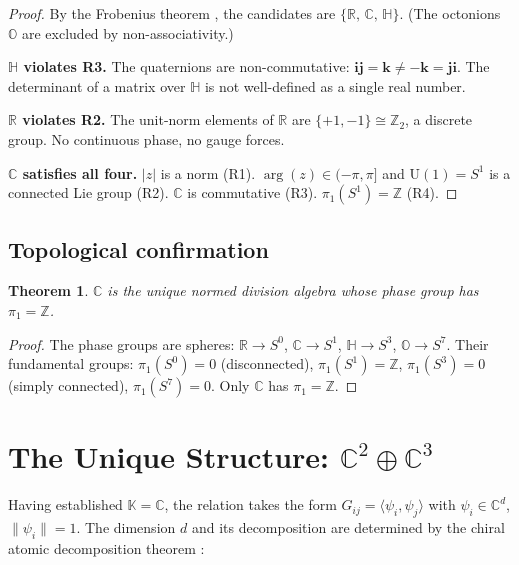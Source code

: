 \documentclass[12pt]{amsart}
\newtheorem{theorem}{Theorem}[section]
\theoremstyle{definition}
\theoremstyle{remark}
\newcommand{\CC}{\mathbb{C}}
\newcommand{\RR}{\mathbb{R}}
\newcommand{\HH}{\mathbb{H}}
\newcommand{\ZZ}{\mathbb{Z}}
\begin{document}
\begin{proof}
By the Frobenius theorem \cite{Frobenius},
the candidates are
$\{\RR,\, \CC,\, \HH\}$.
(The octonions $\mathbb{O}$ are excluded by
non-associativity.)

\medskip\noindent
\textbf{$\HH$ violates R3.}
The quaternions are non-commutative:
$\mathbf{i}\mathbf{j} = \mathbf{k}
\ne -\mathbf{k} = \mathbf{j}\mathbf{i}$.
The determinant of a matrix over $\HH$
is not well-defined as a single real number.

\medskip\noindent
\textbf{$\RR$ violates R2.}
The unit-norm elements of $\RR$ are
$\{+1, -1\} \cong \ZZ_2$,
a discrete group.
No continuous phase, no gauge forces.

\medskip\noindent
\textbf{$\CC$ satisfies all four.}
$|z|$ is a norm (R1).
$\arg(z) \in (-\pi, \pi]$
and $\mathrm{U}(1) = S^1$ is a
connected Lie group (R2).
$\CC$ is commutative (R3).
$\pi_1(S^1) = \ZZ$ (R4).
\end{proof}

\subsection{Topological confirmation}

\begin{theorem}
$\CC$ is the unique normed division algebra
whose phase group has $\pi_1 = \ZZ$.
\end{theorem}

\begin{proof}
The phase groups are spheres:
$\RR \to S^0$,
$\CC \to S^1$,
$\HH \to S^3$,
$\mathbb{O} \to S^7$.
Their fundamental groups:
$\pi_1(S^0) = 0$ (disconnected),
$\pi_1(S^1) = \ZZ$,
$\pi_1(S^3) = 0$ (simply connected),
$\pi_1(S^7) = 0$.
Only $\CC$ has $\pi_1 = \ZZ$.
\end{proof}

\section{The Unique Structure: $\CC^2 \oplus \CC^3$}
\label{sec:structure}

Having established $\mathbb{K} = \CC$,
the relation takes the form
$G_{ij} = \langle \psi_i, \psi_j \rangle$
with $\psi_i \in \CC^d$, $\|\psi_i\| = 1$.
The dimension $d$ and its decomposition
are determined by the chiral atomic
decomposition theorem \cite{Paper1}:
\end{document}
